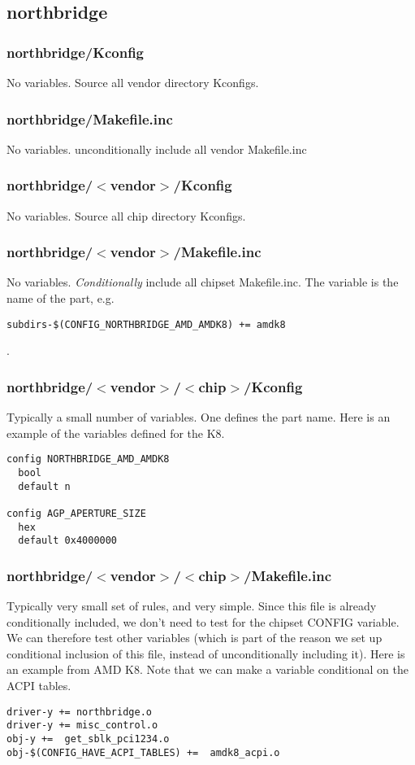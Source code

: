 \documentclass[10pt,letterpaper]{article}
\begin{document}
\subsection{northbridge}
\subsubsection{northbridge/Kconfig}
No variables. Source all vendor directory Kconfigs.
\subsubsection{northbridge/Makefile.inc}
No variables. unconditionally include all vendor Makefile.inc
\subsubsection{northbridge/$<$vendor$>$/Kconfig}
No variables. Source all chip directory Kconfigs.
\subsubsection{northbridge/$<$vendor$>$/Makefile.inc}
No variables. {\em Conditionally} include all chipset Makefile.inc. The variable
is the name of the part, e.g.
\begin{verbatim}
subdirs-$(CONFIG_NORTHBRIDGE_AMD_AMDK8) += amdk8
\end{verbatim}
.
\subsubsection{northbridge/$<$vendor$>$/$<$chip$>$/Kconfig}
Typically a small number of variables. One defines the part name. Here is an example
of the variables defined for the K8.
\begin{verbatim}
config NORTHBRIDGE_AMD_AMDK8
  bool
  default n

config AGP_APERTURE_SIZE
  hex
  default 0x4000000
\end{verbatim}
\subsubsection{northbridge/$<$vendor$>$/$<$chip$>$/Makefile.inc}
Typically very small set of rules, and very simple.
Since this file is already conditionally included,
we don't need to test for the chipset CONFIG variable. We
can therefore test other variables (which is part of the reason
we set up conditional inclusion of this file, instead
of unconditionally including it). Here is an example from AMD K8.
Note that we can make a variable conditional on the ACPI tables.
\begin{verbatim}
driver-y += northbridge.o
driver-y += misc_control.o
obj-y +=  get_sblk_pci1234.o
obj-$(CONFIG_HAVE_ACPI_TABLES) +=  amdk8_acpi.o
\end{verbatim}
\end{document}
